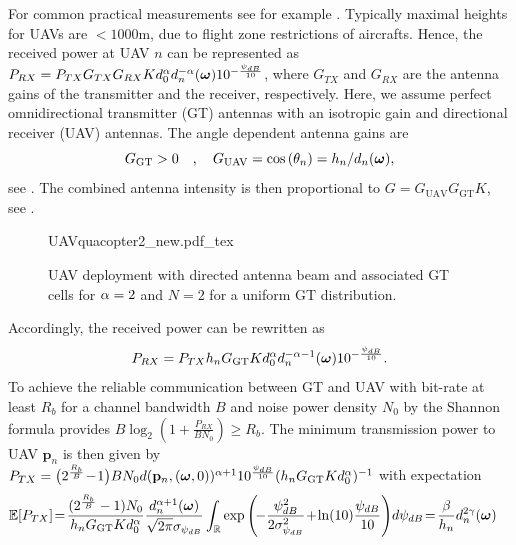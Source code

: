 \documentclass[smallabstract,smallcaptions]{dccpaper}
\newcounter{example}[section]
\renewcommand{\vq}{\mathbf p}
\newcommand{\Rb}{\ensuremath{R_b}}         %
\newcommand{\GGT}{\ensuremath{G_{\text{GT}}}}         %
\newcommand{\GUAV}{\ensuremath{G_{\text{UAV}}}}         %
\begin{document}
%
For common practical measurements see for example \cite{AG18}.  Typically
maximal heights for UAVs are $<1000$m, due to flight zone restrictions of aircrafts.  Hence, the received power at
UAV $n$ can be represented as
%
$P_{RX}=P_{TX}G_{TX}G_{RX}Kd^{\alpha}_0 d_n^{-\alpha}(\boldsymbol{ \omega})10^{-\frac{\psi_{dB}}{10}}$,
%
where $G_{TX}$ and $G_{RX}$ are the antenna gains of the transmitter and the receiver, respectively. Here, we assume
perfect omnidirectional transmitter (GT) antennas with an isotropic gain and directional receiver (UAV) antennas.  The
angle dependent antenna gains are %
%
\begin{equation}
\GGT >0\quad,\quad
  \GUAV = \cos\left(\theta_n\right)=h_n/d_n(\vome),
\label{eq:Gdirected}
\end{equation}
%
see \cite[p.52]{Bal05a}. The combined antenna intensity is then proportional to
%
$G=\GUAV \GGT K$, see .
%
\begin{figure}
  \centering
  \def\svgwidth{.85\textwidth} \scriptsize{
    {UAVquacopter2_new.pdf_tex}}
    \caption{UAV deployment with directed antenna beam and associated GT cells for $\alpha=2$ and $N=2$ for a uniform GT distribution.}
    \label{fig:uavdirected}
\end{figure}
%
Accordingly, the received power can be rewritten as
%
\begin{equation}
  P_{RX}=P_{TX}h_n \GGT K d^{\alpha}_0 d_n^{-\alpha-1}(\vome)10^{-\frac{\psi_{dB}}{10}}.
\end{equation}
%
To achieve the reliable communication between GT and UAV with bit-rate at least $\Rb$ for a
channel bandwidth $B$  and noise power density $N_0$ by the Shannon formula provides 
$B\log_2\left(1+\frac{P_{RX}}{BN_0}\right)\ge\Rb$.
The minimum transmission power to UAV $\vq_n$ is then given by
$P_{TX}=\big(2^{\frac{\Rb}{B}}\!-\!1\big)B N_0d(\vq_n,(\vome,0))^{\alpha+1}10^{\frac{\psi_{dB}}{10}} (h_n \GGT
Kd^{\alpha}_0)^{-1}$ with expectation
%
%
%
\begin{align}
\Expect{P_{TX}}&\! =\!
  \frac{(2^{\frac{\Rb}{B}}-1)N_0 }{ h_n \GGT Kd^{\alpha}_0}
  \frac{d_n^{\alpha+1}(\vome)}{\sqrt{2\pi}\sigma_{\psi_{dB}}} \int_{\R}
     \exp\left(\!-\frac{\psi^2_{dB}}{2\sigma^2_{\psi_{dB}}} \!+\! \ln(10) \frac{\psi_{dB}}{10}\right)\!d\psi_{dB}
     \!=\!\frac{\bet}{h_n}  d_n^{2\gam}(\vome)\label{eq:expectedTX} %
\end{align}
\end{document}
